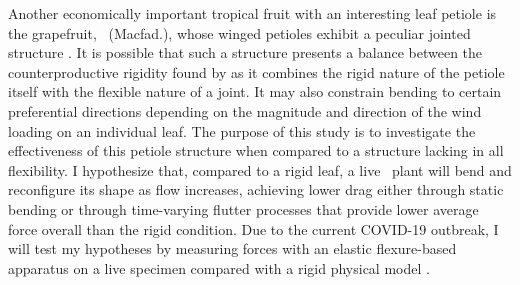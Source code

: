 Another economically important tropical fruit with an interesting leaf petiole is the grapefruit, \Citrusxparadisi\ (Macfad.), whose winged petioles exhibit a peculiar jointed structure \citep{morton1987grapefruit, kumamoto1987mystery, macfayden1837flora}. It is possible that such a structure presents a balance between the counterproductive rigidity found by \citet{miller2012reconfiguration} as it combines the rigid nature of the petiole itself with the flexible nature of a joint. It may also constrain bending to certain preferential directions depending on the magnitude and direction of the wind loading on an individual leaf. The purpose of this study is to investigate the effectiveness of this petiole structure when compared to a structure lacking in all flexibility. I hypothesize that, compared to a rigid leaf, a live \Cxparadisi\ plant will bend and reconfigure its shape as flow increases, achieving lower drag either through static bending or through time-varying flutter processes that provide lower average force overall than the rigid condition. Due to the current COVID-19 outbreak, I will test my hypotheses by measuring forces with an elastic flexure-based apparatus \citep{denny1983simple, bell1984quantifying} on a live specimen compared with a rigid physical model \citep{stevenson2015when, evangelista2014shifts, stewart2006hydrodynamic, vogel2009leaves}. 

